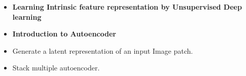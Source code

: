\documentclass{beamer}
\begin{document}
\begin{frame}
\begin{itemize}
\item \textbf{Learning Intrinsic feature representation by Unsupervised Deep learning}
\item \textbf{Introduction to Autoencoder}
\item Generate a latent representation of an input Image patch.
\item Stack multiple autoencoder.
\end{itemize}
\end{frame}
\end{document}

